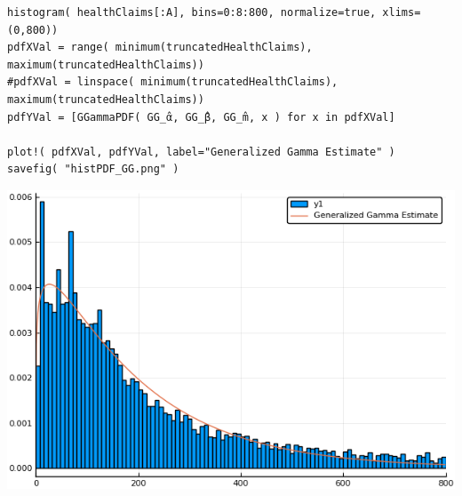 \documentclass[12pt, letterpaper]{paper}
\begin{document}
\begin{verbatim}
histogram( healthClaims[:A], bins=0:8:800, normalize=true, xlims=(0,800))
pdfXVal = range( minimum(truncatedHealthClaims), maximum(truncatedHealthClaims))
#pdfXVal = linspace( minimum(truncatedHealthClaims), maximum(truncatedHealthClaims))
pdfYVal = [GGammaPDF( GG_̂α, GG_̂β, GG_̂m, x ) for x in pdfXVal]

plot!( pdfXVal, pdfYVal, label="Generalized Gamma Estimate" )
savefig( "histPDF_GG.png" )
\end{verbatim}

\begin{center}
\includegraphics[width=.9\linewidth]{histPDF_GG.png}
\end{center}
\end{document}
